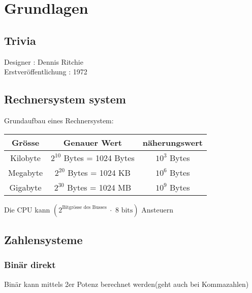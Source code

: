 
\section{Grundlagen}

\subsection{Trivia}

Designer : Dennis Ritchie \\
Erstveröffentlichung : 1972

\subsection{Rechnersystem system}

Grundaufbau eines Rechnersystem:
\begin{center}
\end{center}

\begin{center}
    \begin{tabular}{|c|c|c|} \hline  
        Grösse & Genauer Wert & näherungswert \\ \hline  
        Kilobyte & $2^{10}$ Bytes = 1024 Bytes & $10^3$ Bytes \\ \hline  
        Megabyte & $2^{20}$ Bytes = 1024 KB & $10^6$ Bytes \\ \hline  
        Gigabyte & $2^{30}$ Bytes = 1024 MB & $10^9$ Bytes \\ \hline 
    \end{tabular}
\end{center}

Die CPU kann $(2^{\text{Bitgrösse des Busses }} \cdot \text{ 8 bits})$ Ansteuern

\subsection{Zahlensysteme}

\subsubsection{Binär direkt}

Binär kann mittels 2er Potenz berechnet werden(geht auch bei Kommazahlen)\\

